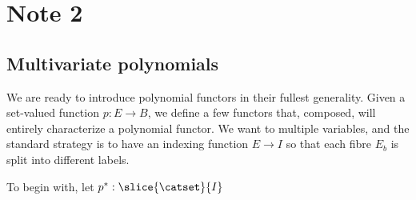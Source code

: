 
\section{Note 2}

\subsection{Multivariate polynomials}

We are ready to introduce polynomial functors in their fullest generality. Given a set-valued function $p:E\to B$, we define a few functors that, composed, will entirely characterize a polynomial functor. We want to multiple variables, and the standard strategy is to have an indexing function $E\to I$ so that each fibre $E_b$ is split into different labels.

To begin with, let $p^*:\slice{\catset}{I}$